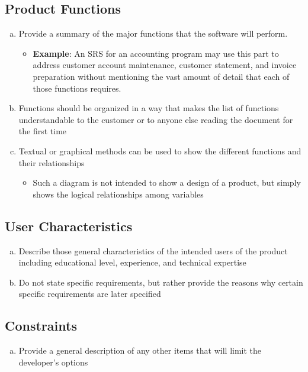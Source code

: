 \documentclass[]{article}
\begin{document}
\subsection{Product Functions}
\label{sub:product_functions}
\begin{enumerate}[a)]
	\item Provide a summary of the major functions that the software will perform.
	\begin{itemize}
		\item \textbf{Example}: An SRS for an accounting program may use this part to address customer account maintenance, customer statement, and invoice preparation without mentioning the vast amount of detail that each of those functions requires.
	\end{itemize}
	\item Functions should be organized in a way that makes the list of functions understandable to the customer or to anyone else reading the document for the first time
	\item Textual or graphical methods can be used to show the different functions and their relationships
	\begin{itemize}
		\item Such a diagram is not intended to show a design of a product, but simply shows the logical relationships among variables
	\end{itemize} 
\end{enumerate}

\subsection{User Characteristics}
\label{sub:user_characteristics}
\begin{enumerate}[a)]
	\item Describe those general characteristics of the intended users of the product including educational level, experience, and technical expertise
	\item Do not state specific requirements, but rather provide the reasons why certain specific requirements are later specified
\end{enumerate}

\subsection{Constraints}
\label{sub:constraints}
\begin{enumerate}[a)]
	\item Provide a general description of any other items that will limit the developer's options
\end{enumerate}
\end{document}
